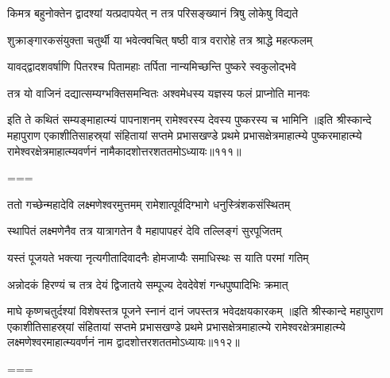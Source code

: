 \twolineshloka
{किमत्र बहुनोक्तेन द्वादश्यां यत्प्रदापयेत्}
{न तत्र परिसङ्ख्यानं त्रिषु लोकेषु विद्यते}%

\twolineshloka
{शुक्राङ्गारकसंयुक्ता चतुर्थी या भवेत्क्वचित्}
{षष्ठी वात्र वरारोहे तत्र श्राद्धे महत्फलम्}%

\twolineshloka
{यावद्द्वादशवर्षाणि पितरश्च पितामहाः}
{तर्पिता नान्यमिच्छन्ति पुष्करे स्वकुलोद्भवे}%

\twolineshloka
{तत्र यो वाजिनं दद्यात्सम्यग्भक्तिसमन्वितः}
{अश्वमेधस्य यज्ञस्य फलं प्राप्नोति मानवः}%

\twolineshloka
{इति ते कथितं सम्यङ्माहात्म्यं पापनाशनम्}
{रामेश्वरस्य देवस्य पुष्करस्य च भामिनि}%
॥इति श्रीस्कान्दे महापुराण एकाशीतिसाहस्र्यां संहितायां सप्तमे प्रभासखण्डे प्रथमे प्रभासक्षेत्रमाहात्म्ये पुष्करमाहात्म्ये रामेश्वरक्षेत्रमाहात्म्यवर्णनं नामैकादशोत्तरशततमोऽध्यायः॥१११॥

===


\vakta{}
\shrota{}
\tags{}
\notes{}

\storymeta





\twolineshloka
{ततो गच्छेन्महादेवि लक्ष्मणेश्वरमुत्तमम्}
{रामेशात्पूर्वदिग्भागे धनुस्त्रिंशकसंस्थितम्}%

\twolineshloka
{स्थापितं लक्ष्मणेनैव तत्र यात्रागतेन वै}
{महापापहरं देवि तल्लिङ्गं सुरपूजितम्}%

\twolineshloka
{यस्तं पूजयते भक्त्या नृत्यगीतादिवादनैः}
{होमजाप्यैः समाधिस्थः स याति परमां गतिम्}%

\twolineshloka
{अन्नोदकं हिरण्यं च तत्र देयं द्विजातये}
{सम्पूज्य देवदेवेशं गन्धपुष्पादिभिः क्रमात्}%

\twolineshloka
{माघे कृष्णचतुर्दश्यां विशेषस्तत्र पूजने}
{स्नानं दानं जपस्तत्र भवेदक्षयकारकम्}%
॥इति श्रीस्कान्दे महापुराण एकाशीतिसाहस्र्यां संहितायां सप्तमे प्रभासखण्डे प्रथमे प्रभासक्षेत्रमाहात्म्ये रामेश्वरक्षेत्रमाहात्म्ये लक्ष्मणेश्वरमाहात्म्यवर्णनं नाम द्वादशोत्तरशततमोऽध्यायः॥११२॥

===


